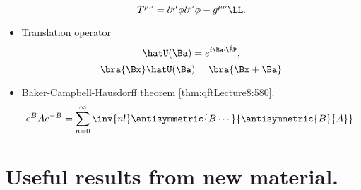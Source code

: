 \begin{itemize}
\begin{dmath}\label{eqn:usefulFormulas:n}
T^{\mu\nu} = \partial^\mu \phi \partial^\nu \phi - g^{\mu\nu} \LL.
\end{dmath}
\item Translation operator
\begin{dmath}\label{eqn:usefulFormulas:n}
\hatU(\Ba) = e^{i \Ba \cdot \hat{\BP}},
\end{dmath}
\begin{dmath}\label{eqn:usefulFormulas:n}
\bra{\Bx} \hatU(\Ba) = \bra{\Bx + \Ba}
\end{dmath}
\item Baker-Campbell-Hausdorff theorem \cref{thm:qftLecture8:580}.
\begin{dmath}\label{eqn:usefulFormulas:n}
e^{B} A e^{-B} = \sum_{n = 0}^\infty \inv{n!} \antisymmetric{B \cdots}{\antisymmetric{B}{A}}.
\end{dmath}
\end{itemize}

\section{Useful results from new material.}

